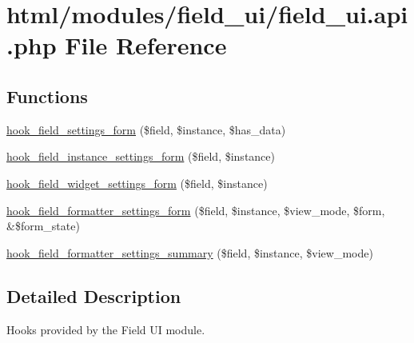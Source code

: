 \hypertarget{field__ui_8api_8php}{
\section{html/modules/field\_\-ui/field\_\-ui.api.php File Reference}
\label{field__ui_8api_8php}
}
\subsection*{Functions}
\begin{DoxyCompactItemize}
\item 
\hyperlink{group__field__types_gab8a2ed808857cc6f3cb661fbc99d30d4}{hook\_\-field\_\-settings\_\-form} (\$field, \$instance, \$has\_\-data)
\item 
\hyperlink{group__field__types_gacce0ff92e36c0054ad131d95e576a13a}{hook\_\-field\_\-instance\_\-settings\_\-form} (\$field, \$instance)
\item 
\hyperlink{group__field__types_gabe5ece2134d0cbdfc3c4793f24c5866c}{hook\_\-field\_\-widget\_\-settings\_\-form} (\$field, \$instance)
\item 
\hyperlink{group__field__types_gaf9b6aefe0b4fe6c03ebd5bd9bd1b891b}{hook\_\-field\_\-formatter\_\-settings\_\-form} (\$field, \$instance, \$view\_\-mode, \$form, \&\$form\_\-state)
\item 
\hyperlink{group__field__types_ga0cdef0fb8588dde07292df1b86f06d81}{hook\_\-field\_\-formatter\_\-settings\_\-summary} (\$field, \$instance, \$view\_\-mode)
\end{DoxyCompactItemize}


\subsection{Detailed Description}
Hooks provided by the Field UI module. 